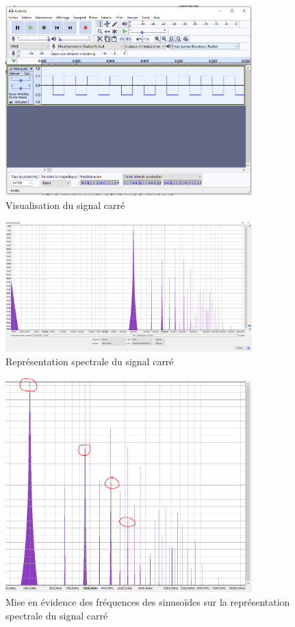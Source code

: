 \documentclass[a4paper]{article}
\begin{document}
\begin{figure}[H]
    \centering
    \includegraphics[width=0.85\textwidth]{images/SignalCarre002.PNG}
    \caption{Visualisation du signal carré}
    \label{fig:SignalCarre002}
\end{figure}

\begin{figure}[H]
    \centering
    \includegraphics[width=0.85\textwidth]{images/SignalCarre003.PNG}
    \caption{Représentation spectrale du signal carré}
    \label{fig:SignalCarre003}
\end{figure}

\begin{figure}[H]
    \centering
    \includegraphics[width=0.85\textwidth]{images/SignalCarre004.PNG}
    \caption{Mise en évidence des fréquences des sinusoïdes sur la représentation spectrale du signal carré}
    \label{fig:SignalCarre004}
\end{figure}
\end{document}
